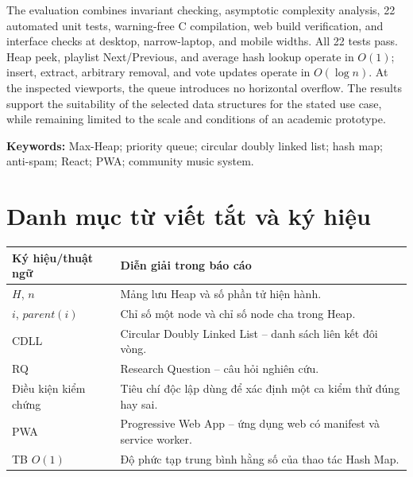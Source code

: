 \documentclass[12pt,a4paper,twoside,openright]{report}
\begin{document}
The evaluation combines invariant checking, asymptotic complexity analysis, 22 automated
unit tests, warning-free C compilation, web build verification, and interface checks at
desktop, narrow-laptop, and mobile widths. All 22 tests pass. Heap peek, playlist
Next/Previous, and average hash lookup operate in $O(1)$; insert, extract, arbitrary
removal, and vote updates operate in $O(\log n)$. At the inspected viewports, the queue
introduces no horizontal overflow. The results support the suitability of the selected
data structures for the stated use case, while remaining limited to the scale and
conditions of an academic prototype.

\textbf{Keywords:} Max-Heap; priority queue; circular doubly linked list; hash map;
anti-spam; React; PWA; community music system.

\cleardoublepage
{}
\tableofcontents
\cleardoublepage
{}
{}
\listoffigures
\cleardoublepage
{}
{}
\listoftables
\cleardoublepage
\chapter*{Danh mục từ viết tắt và ký hiệu}
\begin{tabularx}{\textwidth}{@{}p{3.25cm}X@{}}
\toprule
\textbf{Ký hiệu/thuật ngữ} & \textbf{Diễn giải trong báo cáo}\\
\midrule
$H$, $n$ & Mảng lưu Heap và số phần tử hiện hành.\\
$i$, $parent(i)$ & Chỉ số một node và chỉ số node cha trong Heap.\\
CDLL & Circular Doubly Linked List -- danh sách liên kết đôi vòng.\\
RQ & Research Question -- câu hỏi nghiên cứu.\\
Điều kiện kiểm chứng & Tiêu chí độc lập dùng để xác định một ca kiểm thử đúng hay sai.\\
PWA & Progressive Web App -- ứng dụng web có manifest và service worker.\\
TB $O(1)$ & Độ phức tạp trung bình hằng số của thao tác Hash Map.\\
\bottomrule
\end{tabularx}
\end{document}

